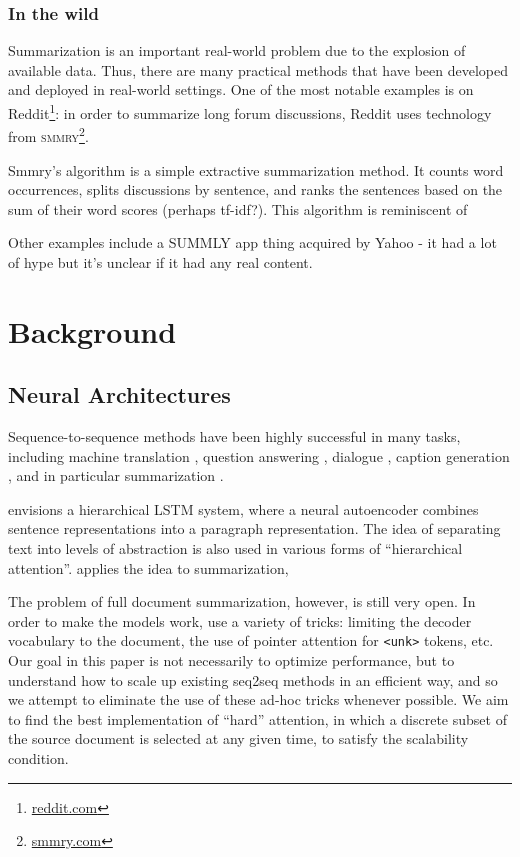 \documentclass[11pt]{report}
\begin{document}
\subsection{In the wild}

Summarization is an important real-world problem due to the explosion of available data. Thus, there are many practical methods that have been developed and deployed in real-world settings. One of the most notable examples is on Reddit\footnote{\url{reddit.com}}: in order to summarize long forum discussions, Reddit uses technology from \textsc{smmry}\footnote{\url{smmry.com}}.

Smmry's algorithm is a simple extractive summarization method. It counts word occurrences, splits discussions by sentence, and ranks the sentences based on the sum of their word scores (perhaps tf-idf?). This algorithm is reminiscent of %

Other examples include a SUMMLY app thing acquired by Yahoo - it had a lot of hype but it's unclear if it had any real content.


\chapter{Background}

\section{Neural Architectures}

Sequence-to-sequence methods have been highly successful in many tasks, including machine translation \citep{sutskever2014sequence, bahdanau2014neural}, question answering \citep{hermann2015read}, dialogue \citep{li2016persona}, caption generation \citep{xu2015captioning}, and in particular summarization \citep{rush2015neural}.

\cite{li2015autoencoder} envisions a hierarchical LSTM system, where a neural autoencoder combines sentence representations into a paragraph representation. The idea of separating text into levels of abstraction is also used in various forms of ``hierarchical attention''.
\cite{nallapati2016seq2seq} applies the idea to summarization, 


The problem of full document summarization, however, is still very open. In order to make the models work, \cite{nallapati2016seq2seq} use a variety of tricks: limiting the decoder vocabulary to the document, the use of pointer attention for \texttt{<unk>} tokens, etc. Our goal in this paper is not necessarily to optimize performance, but to understand how to scale up existing seq2seq methods in an efficient way, and so we attempt to eliminate the use of these ad-hoc tricks whenever possible. We aim to find the best implementation of ``hard'' attention, in which a discrete subset of the source document is selected at any given time, to satisfy the scalability condition.
\end{document}
